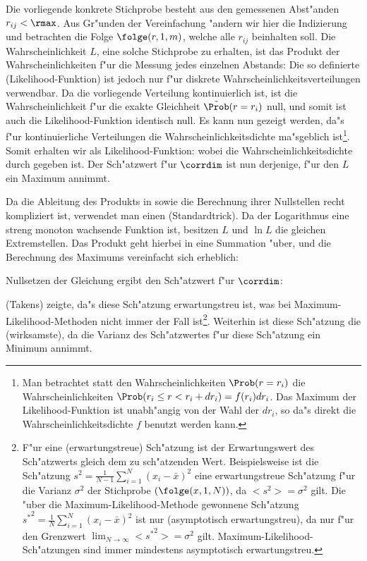 Die vorliegende konkrete Stichprobe
besteht aus den gemessenen Abst"anden $r_{ij}<\rmax$. Aus Gr"unden der Vereinfachung
"andern wir hier die Indizierung und betrachten die Folge $\folge(r,1,m)$, welche alle
$r_{ij}$ beinhalten soll.  Die Wahrscheinlichkeit $L$, eine solche Stichprobe zu erhalten,
ist das Produkt der Wahrscheinlichkeiten f"ur die Messung jedes einzelnen Abstands:
Die so definierte \begriff(Likelihood-Funktion) ist jedoch nur f"ur diskrete
Wahrscheinlichkeitsverteilungen verwendbar.  Da die vorliegende Verteilung kontinuierlich
ist, ist die Wahrscheinlichkeit f"ur die exakte Gleichheit $\tilde\Prob(r=r_i)$ null, und
somit ist auch die Likelihood-Funktion identisch null. Es kann nun gezeigt werden, da"s f"ur
kontinuierliche Verteilungen die Wahrscheinlichkeitsdichte ma"sgeblich ist\footnote{Man
  betrachtet statt den Wahrscheinlichkeiten $\Prob(r=r_i)$ die Wahrscheinlichkeiten $\Prob(r_i\leq r <r_i+
  dr_i) = f(r_i)dr_i$. Das Maximum der Likelihood-Funktion ist unabh"angig von
  der Wahl der $dr_i$, so da"s direkt die Wahrscheinlichkeitsdichte $f$ benutzt werden kann.  }.
Somit erhalten wir als Likelihood-Funktion:
wobei die Wahrscheinlichkeitsdichte durch
gegeben ist.  Der Sch"atzwert f"ur $\corrdim$ ist nun derjenige, f"ur den $L$ ein Maximum
annimmt. 

Da die Ableitung des Produkts in  sowie die Berechnung ihrer
Nullstellen recht kompliziert ist, verwendet man einen \naja(Standardtrick). Da der
Logarithmus eine streng monoton wachsende Funktion ist, besitzen $L$ und $\ln
L$ die gleichen Extremstellen. Das Produkt geht hierbei in eine Summation "uber, und die
Berechnung des Maximums vereinfacht sich erheblich:

Nullsetzen der Gleichung ergibt den Sch"atzwert f"ur $\corrdim$:

 \autor(Takens) zeigte, da"s
diese Sch"atzung erwartungstreu ist, was bei Maximum-Likelihood-Methoden
nicht immer der Fall ist\footnote{F"ur eine \begriff(erwartungstreue) Sch"atzung ist
  der Erwartungswert des Sch"atzwerts gleich dem zu sch"atzenden Wert. Beispielsweise ist
  die Sch"atzung $s^2=\frac1{N-1}\sum_{i=1}^N(x_i-\bar x)^2$ eine erwartungstreue
  Sch"atzung f"ur die Varianz $\sigma^2$ der Stichprobe $(\folge(x,1,N))$, da
  $<s^2>=\sigma^2$ gilt. Die "uber die Maximum-Likelihood-Methode gewonnene Sch"atzung
  ${s^*}^2=\frac1{N}\sum_{i=1}^N(x_i-\bar x)^2$ ist nur \begriff(asymptotisch
  erwartungstreu), da nur f"ur den Grenzwert $\lim_{N\to\infty}<{s^*}^2> = \sigma^2$ gilt.
  Maximum-Likelihood-Sch"atzungen sind immer mindestens asymptotisch erwartungstreu. }.
Weiterhin ist diese Sch"atzung die \begriff(wirksamste), da die Varianz des
Sch"atzwertes f"ur diese Sch"atzung ein Minimum annimmt. 

